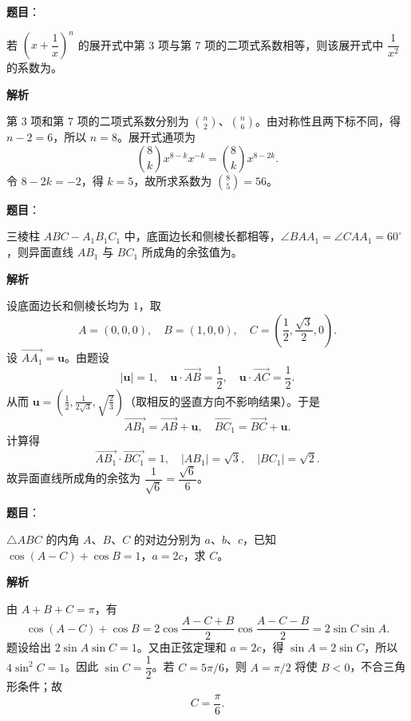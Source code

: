 \begin{answer}

\textbf{题目}：

若 $\left(x+\dfrac1x\right)^n$ 的展开式中第 3 项与第 7 项的二项式系数相等，则该展开式中 $\dfrac1{x^2}$ 的系数为\gkblank{}。

\textbf{解析}

第 3 项和第 7 项的二项式系数分别为 $\binom n2$、$\binom n6$。由对称性且两下标不同，得 $n-2=6$，所以 $n=8$。展开式通项为
\nopagebreak[4]
\[
\binom8k x^{8-k}x^{-k}=\binom8k x^{8-2k}.
\]
令 $8-2k=-2$，得 $k=5$，故所求系数为 $\binom85=56$。


\end{answer}
\begin{answer}

\textbf{题目}：

三棱柱 $ABC-A_1B_1C_1$ 中，底面边长和侧棱长都相等，$\angle BAA_1=\angle CAA_1=60^\circ$，则异面直线 $AB_1$ 与 $BC_1$ 所成角的余弦值为\gkblank{}。

\textbf{解析}

设底面边长和侧棱长均为 $1$，取
\nopagebreak[4]
\[
A=(0,0,0),\quad B=(1,0,0),\quad C=\left(\frac12,\frac{\sqrt3}{2},0\right).
\]
设 $\overrightarrow{AA_1}=\boldsymbol u$。由题设
\nopagebreak[4]
\[
|\boldsymbol u|=1,\quad \boldsymbol u\cdot\overrightarrow{AB}=\frac12,
\quad \boldsymbol u\cdot\overrightarrow{AC}=\frac12.
\]
从而 $\boldsymbol u=\left(\frac12,\frac1{2\sqrt3},\sqrt{\frac23}\right)$（取相反的竖直方向不影响结果）。于是
\nopagebreak[4]
\[
\overrightarrow{AB_1}=\overrightarrow{AB}+\boldsymbol u,
\quad
\overrightarrow{BC_1}=\overrightarrow{BC}+\boldsymbol u.
\]
计算得
\nopagebreak[4]
\[
\overrightarrow{AB_1}\cdot\overrightarrow{BC_1}=1,
\quad |AB_1|=\sqrt3,
\quad |BC_1|=\sqrt2.
\]
故异面直线所成角的余弦为 $\dfrac1{\sqrt6}=\dfrac{\sqrt6}{6}$。


\end{answer}
\begin{answer}

\textbf{题目}：

$\triangle ABC$ 的内角 $A\text{、}B\text{、}C$ 的对边分别为 $a\text{、}b\text{、}c$，已知 $\cos(A-C)+\cos B=1$，$a=2c$，求 $C$。

\textbf{解析}

由 $A+B+C=\pi$，有
\nopagebreak[4]
\[
\cos(A-C)+\cos B
=2\cos\frac{A-C+B}{2}\cos\frac{A-C-B}{2}
=2\sin C\sin A.
\]
题设给出 $2\sin A\sin C=1$。又由正弦定理和 $a=2c$，得 $\sin A=2\sin C$，所以 $4\sin^2C=1$。因此 $\sin C=\dfrac12$。若 $C=5\pi/6$，则 $A=\pi/2$ 将使 $B<0$，不合三角形条件；故
\nopagebreak[4]
\[
C=\frac\pi6.
\]


\end{answer}
